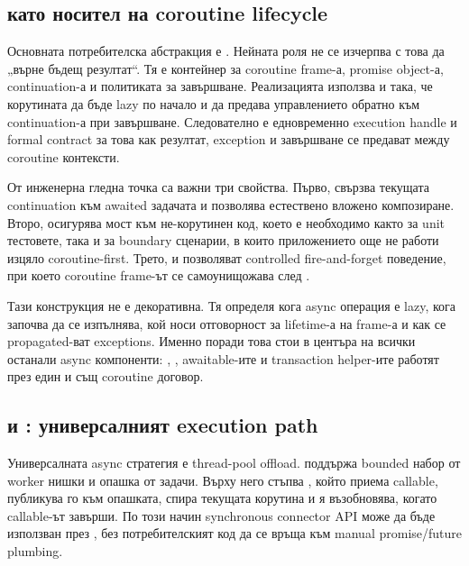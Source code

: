 \subsection{ като носител на coroutine lifecycle}

Основната потребителска абстракция е . Нейната роля не се изчерпва с това да „върне бъдещ резултат“. Тя е контейнер за coroutine frame-а, promise object-а, continuation-а и политиката за завършване. Реализацията използва  и  така, че корутината да бъде lazy по начало и да предава управлението обратно към continuation-а при завършване. Следователно  е едновременно execution handle и formal contract за това как резултат, exception и завършване се предават между coroutine контексти.

От инженерна гледна точка са важни три свойства. Първо,  свързва текущата continuation към awaited задачата и позволява естествено вложено  композиране. Второ,  осигурява мост към не-корутинен код, което е необходимо както за unit тестовете, така и за boundary сценарии, в които приложението още не работи изцяло coroutine-first. Трето,  и  позволяват controlled fire-and-forget поведение, при което coroutine frame-ът се самоунищожава след .

Тази конструкция не е декоративна. Тя определя кога async операция е lazy, кога започва да се изпълнява, кой носи отговорност за lifetime-а на frame-а и как се propagated-ват exceptions. Именно поради това  стои в центъра на всички останали async компоненти: , ,  awaitable-ите и transaction helper-ите работят през един и същ coroutine договор.

\subsection{ и : универсалният execution path}

Универсалната async стратегия е thread-pool offload.  поддържа bounded набор от worker нишки и опашка от задачи. Върху него стъпва , който приема callable, публикува го към опашката, спира текущата корутина и я възобновява, когато callable-ът завърши. По този начин synchronous connector API може да бъде използван през , без потребителският код да се връща към manual promise/future plumbing.

